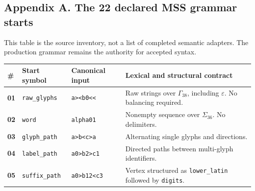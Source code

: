 \documentclass[
  11pt,
]{article}
\begin{document}
\clearpage
\begin{landscape}
\subsection{Appendix A. The 22 declared MSS grammar
starts}\label{appendix-a.-the-22-declared-mss-grammar-starts}

This table is the source inventory, not a list of completed semantic
adapters. The production grammar remains the authority for accepted
syntax.

\begin{longtable}[]{@{}
  >{\raggedright\arraybackslash}p{}
  >{\raggedright\arraybackslash}p{}
  >{\raggedright\arraybackslash}p{}
  >{\raggedright\arraybackslash}p{}@{}}
\toprule\noalign{}
\begin{minipage}[b]{\linewidth}\raggedright
\#
\end{minipage} & \begin{minipage}[b]{\linewidth}\raggedright
Start symbol
\end{minipage} & \begin{minipage}[b]{\linewidth}\raggedright
Canonical input
\end{minipage} & \begin{minipage}[b]{\linewidth}\raggedright
Lexical and structural contract
\end{minipage} \\
\midrule\noalign{}
\endhead
\bottomrule\noalign{}
\endlastfoot
\textbf{01} & \nolinkurl{raw_glyphs} &
\texttt{a\textgreater{}\textless{}b0\textless{}\textless{}} & Raw
strings over \(\Gamma_{38}\), including \(\varepsilon\). No balancing
required. \\
\textbf{02} & \nolinkurl{word} & \nolinkurl{alpha01} & Nonempty sequence over
\(\Sigma_{36}\). No delimiters. \\
\textbf{03} & \nolinkurl{glyph_path} &
\texttt{a\textgreater{}b\textless{}c\textgreater{}a} & Alternating
single glyphs and directions. \\
\textbf{04} & \nolinkurl{label_path} &
\texttt{a0\textgreater{}b2\textgreater{}c1} & Directed paths between
multi-glyph identifiers. \\
\textbf{05} & \nolinkurl{suffix_path} &
\texttt{a0\textgreater{}b12\textless{}c3} & Vertex structured as
\nolinkurl{lower_latin} followed by \nolinkurl{digits}. \\

\end{longtable}
\end{landscape}
\end{document}
